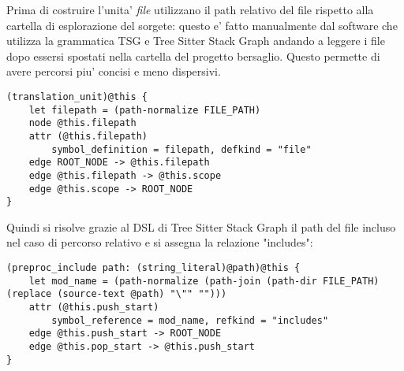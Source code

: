 Prima di costruire l'unita' \emph{file} utilizzano il path relativo del file rispetto alla cartella di esplorazione del sorgete: questo e' fatto manualmente dal software che utilizza la grammatica TSG e Tree Sitter Stack Graph andando a leggere i file dopo essersi spostati nella cartella del progetto bersaglio. Questo permette di avere percorsi piu' concisi e meno dispersivi.

\begin{lstlisting}
(translation_unit)@this {
    let filepath = (path-normalize FILE_PATH)
    node @this.filepath
    attr (@this.filepath)
        symbol_definition = filepath, defkind = "file"
    edge ROOT_NODE -> @this.filepath
    edge @this.filepath -> @this.scope
    edge @this.scope -> ROOT_NODE
}
\end{lstlisting}

Quindi si risolve grazie al DSL di Tree Sitter Stack Graph il path del file incluso nel caso di percorso relativo e si assegna la relazione "includes":

\begin{lstlisting}
(preproc_include path: (string_literal)@path)@this {
    let mod_name = (path-normalize (path-join (path-dir FILE_PATH) (replace (source-text @path) "\"" "")))
    attr (@this.push_start)
        symbol_reference = mod_name, refkind = "includes"
    edge @this.push_start -> ROOT_NODE
    edge @this.pop_start -> @this.push_start
}
\end{lstlisting}

